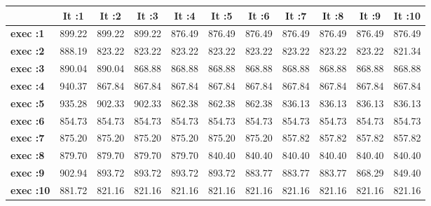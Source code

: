\begin{tiny}\begin{tabular}{|l|c|c|c|c|c|c|c|c|c|c|}
\hline
&\textbf{It :1}&\textbf{It :2}&\textbf{It :3}&\textbf{It :4}&\textbf{It :5}&\textbf{It :6}&\textbf{It :7}&\textbf{It :8}&\textbf{It :9}&\textbf{It :10}\\\hline
\textbf{exec :1}&899.22&899.22&899.22&876.49&876.49&876.49&876.49&876.49&876.49&876.49\\\hline
\textbf{exec :2}&888.19&823.22&823.22&823.22&823.22&823.22&823.22&823.22&823.22&821.34\\\hline
\textbf{exec :3}&890.04&890.04&868.88&868.88&868.88&868.88&868.88&868.88&868.88&868.88\\\hline
\textbf{exec :4}&940.37&867.84&867.84&867.84&867.84&867.84&867.84&867.84&867.84&867.84\\\hline
\textbf{exec :5}&935.28&902.33&902.33&862.38&862.38&862.38&836.13&836.13&836.13&836.13\\\hline
\textbf{exec :6}&854.73&854.73&854.73&854.73&854.73&854.73&854.73&854.73&854.73&854.73\\\hline
\textbf{exec :7}&875.20&875.20&875.20&875.20&875.20&875.20&857.82&857.82&857.82&857.82\\\hline
\textbf{exec :8}&879.70&879.70&879.70&879.70&840.40&840.40&840.40&840.40&840.40&840.40\\\hline
\textbf{exec :9}&902.94&893.72&893.72&893.72&893.72&883.77&883.77&883.77&868.29&849.40\\\hline
\textbf{exec :10}&881.72&821.16&821.16&821.16&821.16&821.16&821.16&821.16&821.16&821.16\\\hline
\end{tabular}
\end{tiny}
